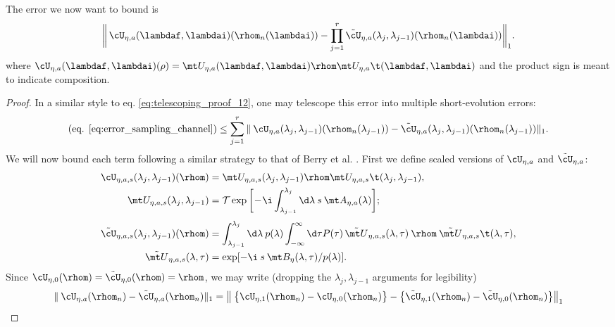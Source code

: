 \begin{lemma}
The error we now want to bound is
\begin{align}\label{eq:error_sampling_channel}
    \bigg\| \, \cU_{\eta, a}(\lambdaf, \lambdai)(\rhom_n(\lambdai)) - \prod_{j=1}^r \tilde\cU_{\eta, a}(\lambda_j, \lambda_{j-1})(\rhom_n(\lambdai)) \bigg\|_1.
\end{align}
where $\cU_{\eta, a}(\lambdaf, \lambdai)(\rho) = \mt U_{\eta, a}(\lambdaf, \lambdai) \rhom \mt U_{\eta, a}\t(\lambdaf, \lambdai)$ and the product sign is meant to indicate composition. 
\end{lemma}


\begin{proof}
In a similar style to eq. \ref{eq:telescoping_proof_12}, one may telescope this error into multiple short-evolution errors:
\begin{align}
    \text{(eq. \ref{eq:error_sampling_channel})} \leq \sum_{j=1}^r \|\> \cU_{\eta, a}(\lambda_j, \lambda_{j-1})(\rhom_n(\lambda_{j-1})) - \tilde\cU_{\eta, a}(\lambda_j, \lambda_{j-1})(\rhom_n(\lambda_{j-1}))\|_1.
\end{align}
We will now bound each term following a similar strategy to that of Berry et al. \cite{Berry2020}. First we define scaled versions of $\cU_{\eta, a}$ and $\tilde\cU_{\eta, a}$:
\begin{align}
    \cU_{\eta, a, s}(\lambda_j, \lambda_{j-1})(\rhom) &= \mt U_{\eta, a, s}(\lambda_j, \lambda_{j-1}) \rhom \mt U_{\eta, a, s}\t(\lambda_j, \lambda_{j-1}), \nonumber \\
    \mt U_{\eta, a, s}(\lambda_j, \lambda_{j-1}) &= \mathcal T \exp \bigg[ \! -\!\i \int_{\lambda_{j-1}}^{\lambda_j} \d\lambda \> s \> \mt A_{\eta, a}(\lambda) \bigg] ; \\[1mm]
    \tilde\cU_{\eta, a, s}(\lambda_j, \lambda_{j-1})(\rhom) &= \int_{\lambda_{j-1}}^{\lambda_j} \d\lambda \> p(\lambda)  \int_{-\infty}^{\infty} \d\tau P(\tau) \, \tilde{\mt U}_{\eta, a, s}(\lambda, \tau) \> \rhom \> \tilde{\mt U}_{\eta, a, s}\t(\lambda, \tau), \nonumber \\
    \tilde{\mt U}_{\eta, a, s}(\lambda, \tau) &= \exp[-\i \> s \> \mt B_\eta(\lambda, \tau) / p(\lambda)].
\end{align}
Since $\cU_{\eta, 0}(\rhom) = \tilde\cU_{\eta, 0}(\rhom) = \rhom$, we may write (dropping the $\lambda_j, \lambda_{j-1}$ arguments for legibility)
\begin{align}
    \|\> \cU_{\eta, a}(\rhom_n) - \tilde\cU_{\eta, a}(\rhom_n)\|_1 &= \big\|\> \big\{ \cU_{\eta, 1}(\rhom_n) - \cU_{\eta, 0}(\rhom_n) \big\} - \big\{ \tilde\cU_{\eta, 1}(\rhom_n) - \tilde\cU_{\eta, 0}(\rhom_n) \big\} \big\|_1 \nonumber \\

\end{align}
\end{proof}

